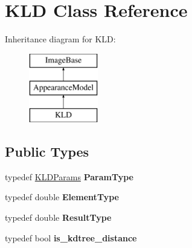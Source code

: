 \hypertarget{classKLD}{\section{K\-L\-D Class Reference}
\label{classKLD}
}
Inheritance diagram for K\-L\-D\-:\begin{figure}[H]
\begin{center}
\leavevmode
\includegraphics[height=3.000000cm]{classKLD}
\end{center}
\end{figure}
\subsection*{Public Types}
\begin{DoxyCompactItemize}
\item 
\hypertarget{classKLD_af85302b0a97fc784ea17583f84babf86}{typedef \hyperlink{structKLDParams}{K\-L\-D\-Params} {\bfseries Param\-Type}}\label{classKLD_af85302b0a97fc784ea17583f84babf86}

\item 
\hypertarget{classKLD_afdc6d3ea875df625c20faf37263b621f}{typedef double {\bfseries Element\-Type}}\label{classKLD_afdc6d3ea875df625c20faf37263b621f}

\item 
\hypertarget{classKLD_a2234a2ff6cc21aa161edb2975aa7d475}{typedef double {\bfseries Result\-Type}}\label{classKLD_a2234a2ff6cc21aa161edb2975aa7d475}

\item 
\hypertarget{classKLD_aceb785fb297217dec53b98fabd583b13}{typedef bool {\bfseries is\-\_\-kdtree\-\_\-distance}}\label{classKLD_aceb785fb297217dec53b98fabd583b13}

\end{DoxyCompactItemize}

